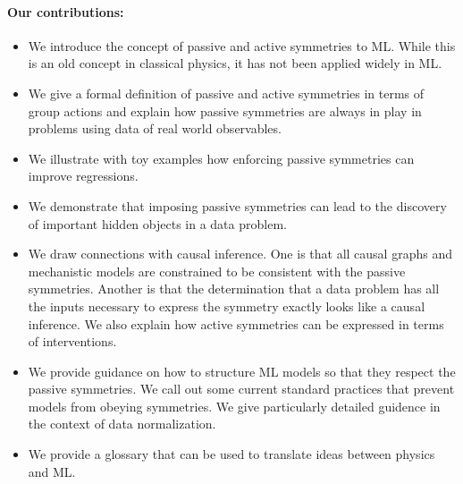 \documentclass{article} %
\begin{document}
\paragraph{Our contributions:}
\begin{itemize}
\item
We introduce the concept of passive and active symmetries to ML.
While this is an old concept in classical physics, it has not been applied widely in ML.
\item
We give a formal definition of passive and active symmetries in terms of group actions and explain how passive symmetries are always in play in problems using data of real world observables.
\item
We illustrate with toy examples how enforcing passive symmetries can improve regressions. 
\item
We demonstrate that imposing passive symmetries can lead to the discovery of important hidden objects in a data problem.
\item
We draw connections with causal inference.
One is that all causal graphs and mechanistic models are constrained to be consistent with the passive symmetries.
Another is that the determination that a data problem has all the inputs necessary to express the symmetry exactly looks like a causal inference. 
We also explain how active symmetries can be expressed in terms of interventions.
\item 
We provide guidance on how to structure ML models so that they respect the passive symmetries. We call out some current standard practices that prevent models from obeying symmetries.
We give particularly detailed guidence in the context of data normalization.
\item
We provide a glossary that can be used to translate ideas between physics and ML. 
\end{itemize}
\end{document}
